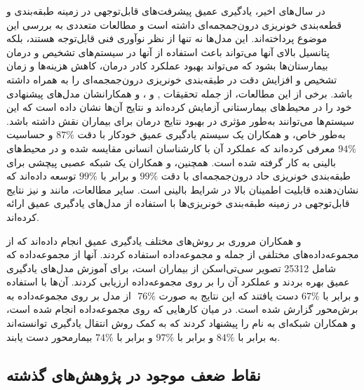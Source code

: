  در سال‌های اخیر، یادگیری عمیق پیشرفت‌های قابل‌توجهی در زمینه طبقه‌بندی و قطعه‌بندی خونریزی درون‌جمجمه‌ای داشته است و مطالعات متعددی به بررسی این موضوع پرداخته‌اند. این مدل‌ها نه تنها از نظر نوآوری فنی قابل‌توجه هستند، بلکه پتانسیل بالای آنها می‌تواند باعث استفاده از آنها در سیستم‌های تشخیص و درمان بیمارستان‌ها بشود که می‌تواند بهبود عملکرد کادر درمان، کاهش هزینه‌ها و زمان تشخیص و افزایش دقت در طبقه‌بندی خونریزی درون‌جمجمه‌ای را به همراه داشته باشد. برخی از این مطالعات، از جمله تحقیقات
  \cite{titano2018automated}, \cite{arbabshirani2018advanced} و \cite{kuo2019expert}،
و همکارانشان مدل‌های پیشنهادی خود را در محیط‌های بیمارستانی آزمایش کرده‌اند و نتایج آن‌ها نشان داده است که این سیستم‌ها می‌توانند به‌طور مؤثری در بهبود نتایج درمان برای بیماران نقش داشته باشد. به‌طور خاص،  و همکاران یک سیستم یادگیری عمیق خودکار با دقت \(87\%\) و حساسیت \(94\%\) معرفی کرده‌اند که عملکرد آن با کارشناسان انسانی مقایسه شده و در محیط‌های بالینی به کار گرفته شده است. همچنین،  و همکاران یک شبکه عصبی پیچشی برای طبقه‌بندی خونریزی حاد درون‌جمجمه‌ای با دقت \(99\%\) و  برابر با
 \(99\%\)
توسعه داده‌اند که نشان‌دهنده قابلیت اطمینان بالا در شرایط بالینی است. سایر مطالعات، مانند
 \cite{chang2018hybrid}
  و
   \cite{chilamkurthy2018deep}
    نیز نتایج قابل‌توجهی در زمینه طبقه‌بندی خونریزی‌ها با استفاده از مدل‌های یادگیری عمیق ارائه کرده‌اند.
 
 \cite{neethi2022stroke} و همکاران 
 مروری بر روش‌های مختلف یادگیری عمیق انجام داده‌اند که از مجموعه‌داده‌های مختلفی از جمله  و مجموعه‌داده  استفاده کردند. آنها از مجموعه‌داده  که شامل 25312 تصویر سی‌تی‌اسکن از بیماران است، برای آموزش مدل‌های یادگیری عمیق بهره بردند و عملکرد آن را بر روی مجموعه‌داده  ارزیابی کردند. آن‌ها با استفاده از مدل  بر روی مجموعه‌داده  به
  ‎ \(76\%\) و 
   برابر با 
   \(67\%\) 
   دست یافتند که این نتایج به صورت برش‌محور
   گزارش شده است.
 در میان کارهایی که روی مجموعه‌داده  انجام شده است،
  \cite{kyung2022improved}
و همکاران
شبکه‌ای به نام 
را پیشنهاد کردند که به کمک روش انتقال یادگیری
توانسته‌اند به  برابر با
 \(84\%\)
 و 
 برابر با 
  \(97\%\)
  و 
  برابر با
  \(74\%\)
  بیمارمحور 
   دست یابند.
 
 
 \subsection{نقاط ضعف موجود در پژوهش‌های گذشته}
 
